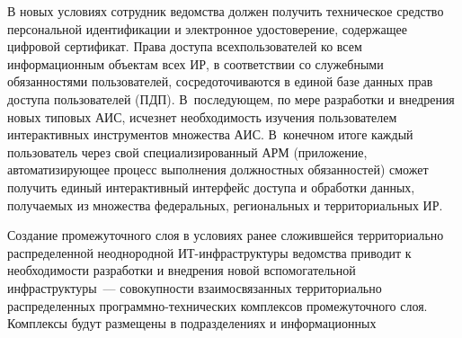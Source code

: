 \begin{multicols}{2}
      В новых условиях сотрудник ведомства должен получить техническое средство 
персональной идентификации и электронное удостоверение, содержащее цифровой 
сертификат. Права доступа всех\linebreak пользователей ко всем информационным объектам всех ИР, в 
соответствии со служебными обязанностями пользователей, сосредоточиваются в единой\linebreak
 базе 
данных прав доступа пользователей (ПДП). В~последующем, по мере разработки и внедрения новых 
типовых АИС, исчезнет необходимость изуче\-ния пользователем интерактивных инструментов 
множества АИС. В~конечном итоге каждый пользователь через свой специализированный 
АРМ (приложение, автоматизирующее процесс выполнения должностных обязанностей) 
сможет получить единый интерактивный интерфейс доступа и обработки данных, получаемых 
из множества федеральных, региональных и территориальных ИР.
      
       Создание промежуточного слоя в условиях ранее сложившейся территориально 
распределенной неоднородной ИТ-ин\-фра\-струк\-ту\-ры ведомства\linebreak
приводит к необходимости 
разработки и внедрения новой вспомогательной инфраструктуры~--- совокупности 
взаимосвязанных территориально\linebreak
 распределенных программно-технических комплексов 
промежуточного слоя. Комплексы будут размещены в подразделениях и информационных\linebreak\vspace*{-12pt}
\pagebreak

\end{multicols}

\begin{figure} %
\vspace*{1pt}
\begin{center}
\mbox{%
\epsfxsize=161.835mm
}
\end{center}
\vspace*{-3pt}
\vspace*{6pt}
\end{figure}

